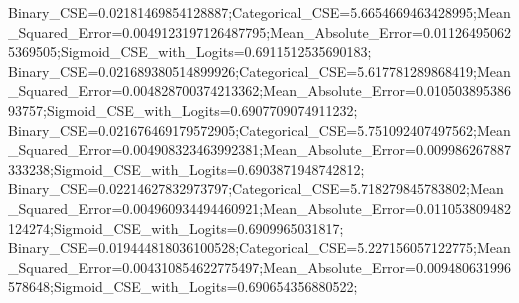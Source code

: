 Binary_CSE=0.02181469854128887;Categorical_CSE=5.6654669463428995;Mean_Squared_Error=0.0049123197126487795;Mean_Absolute_Error=0.011264950625369505;Sigmoid_CSE_with_Logits=0.6911512535690183;
Binary_CSE=0.021689380514899926;Categorical_CSE=5.617781289868419;Mean_Squared_Error=0.004828700374213362;Mean_Absolute_Error=0.01050389538693757;Sigmoid_CSE_with_Logits=0.6907709074911232;
Binary_CSE=0.021676469179572905;Categorical_CSE=5.751092407497562;Mean_Squared_Error=0.004908323463992381;Mean_Absolute_Error=0.009986267887333238;Sigmoid_CSE_with_Logits=0.6903871948742812;
Binary_CSE=0.02214627832973797;Categorical_CSE=5.718279845783802;Mean_Squared_Error=0.004960934494460921;Mean_Absolute_Error=0.011053809482124274;Sigmoid_CSE_with_Logits=0.6909965031817;
Binary_CSE=0.019444818036100528;Categorical_CSE=5.227156057122775;Mean_Squared_Error=0.004310854622775497;Mean_Absolute_Error=0.009480631996578648;Sigmoid_CSE_with_Logits=0.690654356880522;
